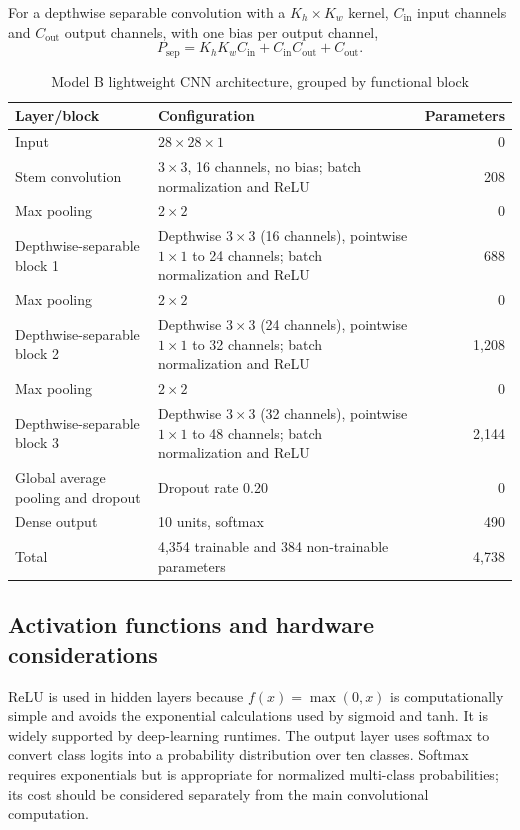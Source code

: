 \documentclass[12pt,a4paper]{article}
\begin{document}
For a depthwise separable convolution with a $K_h\times K_w$ kernel, $C_{\mathrm{in}}$ input channels and $C_{\mathrm{out}}$ output channels, with one bias per output channel,
\begin{equation}\label{eq:sepparams}
P_{\mathrm{sep}}=K_hK_wC_{\mathrm{in}}+C_{\mathrm{in}}C_{\mathrm{out}}+C_{\mathrm{out}}.
\end{equation}

\begin{table}[H]
\centering
\caption{Model B lightweight CNN architecture, grouped by functional block}
\label{tab:modelb}
\small
\begin{tabularx}{\textwidth}{l X r}
\toprule
Layer/block & Configuration & Parameters\\
\midrule
Input & $28\times28\times1$ & 0\\
Stem convolution & $3\times3$, 16 channels, no bias; batch normalization and ReLU & 208\\
Max pooling & $2\times2$ & 0\\
Depthwise-separable block 1 & Depthwise $3\times3$ (16 channels), pointwise $1\times1$ to 24 channels; batch normalization and ReLU & 688\\
Max pooling & $2\times2$ & 0\\
Depthwise-separable block 2 & Depthwise $3\times3$ (24 channels), pointwise $1\times1$ to 32 channels; batch normalization and ReLU & 1,208\\
Max pooling & $2\times2$ & 0\\
Depthwise-separable block 3 & Depthwise $3\times3$ (32 channels), pointwise $1\times1$ to 48 channels; batch normalization and ReLU & 2,144\\
Global average pooling and dropout & Dropout rate 0.20 & 0\\
Dense output & 10 units, softmax & 490\\
\midrule
Total & 4,354 trainable and 384 non-trainable parameters & 4,738\\
\bottomrule
\end{tabularx}
\end{table}


\subsection{Activation functions and hardware considerations}
ReLU is used in hidden layers because $f(x)=\max(0,x)$ is computationally simple and avoids the exponential calculations used by sigmoid and tanh. It is widely supported by deep-learning runtimes. The output layer uses softmax to convert class logits into a probability distribution over ten classes. Softmax requires exponentials but is appropriate for normalized multi-class probabilities; its cost should be considered separately from the main convolutional computation.
\end{document}
